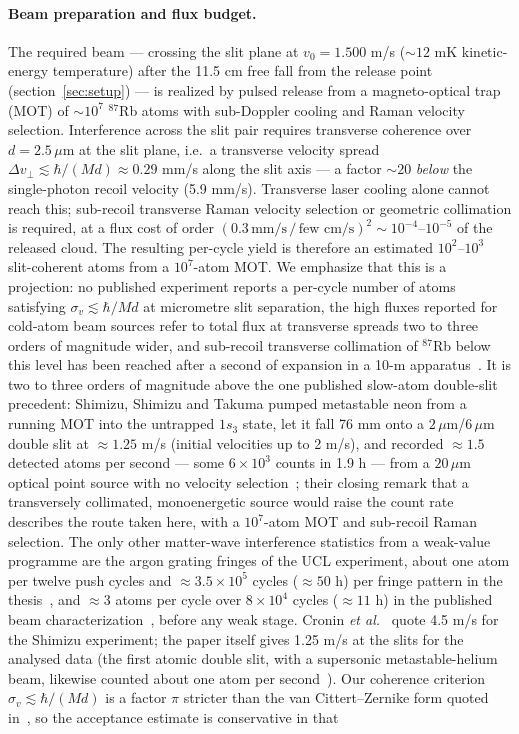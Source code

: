 \documentclass[11pt,a4paper]{article}
\begin{document}
\paragraph{Beam preparation and flux budget.} The required beam --- crossing the slit plane at $v_0 = 1.500$ m/s ($\sim 12$ mK kinetic-energy temperature) after the 11.5 cm free fall from the release point (section~\ref{sec:setup}) --- is realized by pulsed release from a magneto-optical trap (MOT) of $\sim 10^7$ ${}^{87}$Rb atoms with sub-Doppler cooling and Raman velocity selection. Interference across the slit pair requires transverse coherence over $d = 2.5\,\mu$m at the slit plane, i.e.\ a transverse velocity spread $\Delta v_\perp \lesssim \hbar/(Md) \approx 0.29$ mm/s along the slit axis --- a factor $\sim 20$ \emph{below} the single-photon recoil velocity (5.9 mm/s). Transverse laser cooling alone cannot reach this; sub-recoil transverse Raman velocity selection or geometric collimation is required, at a flux cost of order $(0.3\,\text{mm/s}\,/\,\text{few cm/s})^2 \sim 10^{-4}$--$10^{-5}$ of the released cloud. The resulting per-cycle yield is therefore an estimated $10^2$--$10^3$ slit-coherent atoms from a $10^7$-atom MOT. We emphasize that this is a projection: no published experiment reports a per-cycle number of atoms satisfying $\sigma_v \lesssim \hbar/Md$ at micrometre slit separation, the high fluxes reported for cold-atom beam sources refer to total flux at transverse spreads two to three orders of magnitude wider, and sub-recoil transverse collimation of $^{87}$Rb below this level has been reached after a second of expansion in a 10-m apparatus~\cite{Kovachy2015}. It is two to three orders of magnitude above the one published slow-atom double-slit precedent: Shimizu, Shimizu and Takuma pumped metastable neon from a running MOT into the untrapped $1s_3$ state, let it fall 76 mm onto a $2\,\mu$m/$6\,\mu$m double slit at $\approx 1.25$ m/s (initial velocities up to 2 m/s), and recorded $\approx 1.5$ detected atoms per second --- some $6\times 10^3$ counts in 1.9 h --- from a $20\,\mu$m optical point source with no velocity selection~\cite{Shimizu1992}; their closing remark that a transversely collimated, monoenergetic source would raise the count rate describes the route taken here, with a $10^7$-atom MOT and sub-recoil Raman selection. The only other matter-wave interference statistics from a weak-value programme are the argon grating fringes of the UCL experiment, about one atom per twelve push cycles and $\approx 3.5\times 10^5$ cycles ($\approx 50$ h) per fringe pattern in the thesis~\cite{Morley2020}, and $\approx 3$ atoms per cycle over $8\times 10^4$ cycles ($\approx 11$ h) in the published beam characterization~\cite{Morley2021}, before any weak stage. Cronin \emph{et al.}~\cite{Cronin2009} quote 4.5 m/s for the Shimizu experiment; the paper itself gives 1.25 m/s at the slits for the analysed data (the first atomic double slit, with a supersonic metastable-helium beam, likewise counted about one atom per second~\cite{CarnalMlynek1991, Cronin2009}). Our coherence criterion $\sigma_v \lesssim \hbar/(Md)$ is a factor $\pi$ stricter than the van Cittert--Zernike form quoted in~\cite{Cronin2009}, so the acceptance estimate is conservative in that 
\end{document}
